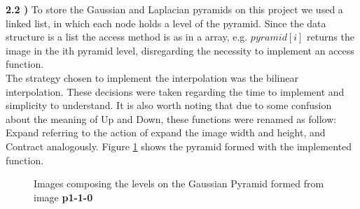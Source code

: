 \documentclass[12pt,a4paper]{article}
\begin{document}
\textbf{2.2 )} To store the Gaussian and Laplacian pyramids on this project we used a linked list, in which each node holds a level of the pyramid. Since the data structure is a list the access method is as in a array, e.g. $pyramid[i]$ returns the image in the ith pyramid level, disregarding the necessity to implement an access function. \\

The strategy chosen to implement the interpolation was the bilinear interpolation. These decisions were taken regarding the time to implement and simplicity to understand. It is also worth noting that due to some confusion about the meaning of Up and Down, these functions were renamed as follow: Expand referring to the action of expand the image width and height, and Contract analogously. Figure \ref{fig:gaussianPyramid} shows the pyramid formed with the implemented function. \\

\begin{figure}[!h]
	\centering
	\quad
	\quad
	\caption{Images composing the levels on the Gaussian Pyramid formed from image \textbf{p1-1-0}}
	\label{fig:gaussianPyramid}
\end{figure}
\end{document}
